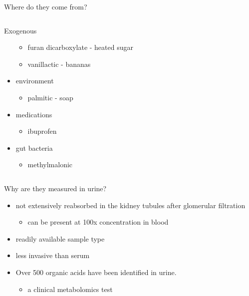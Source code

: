 \documentclass[presentation, smaller]{beamer}
\begin{document}
\begin{frame}[label={sec:orgheadline6}]{Where do they come from?}
\begin{columns}
\begin{column}{0.45\columnwidth}
\begin{block}{Exogenous}
\begin{itemize}
\begin{itemize}
\item furan dicarboxylate - heated sugar
\item vanillactic - bananas
\end{itemize}
\item environment
\begin{itemize}
\item palmitic - soap
\end{itemize}
\item medications
\begin{itemize}
\item ibuprofen
\end{itemize}
\item gut bacteria
\begin{itemize}
\item methylmalonic
\end{itemize}
\end{itemize}
\end{block}
\end{column}
\end{columns}
\end{frame}

\begin{frame}[label={sec:orgheadline7}]{Why are they measured in urine?}
\begin{itemize}
\item not extensively reabsorbed in the kidney tubules after glomerular
filtration
\begin{itemize}
\item can be present at 100x concentration in blood
\end{itemize}
\item readily available sample type
\item less invasive than serum
\item Over 500 organic acids have been identified in urine.
\begin{itemize}
\item a clinical metabolomics test
\end{itemize}
\end{itemize}
\end{frame}
\end{document}
